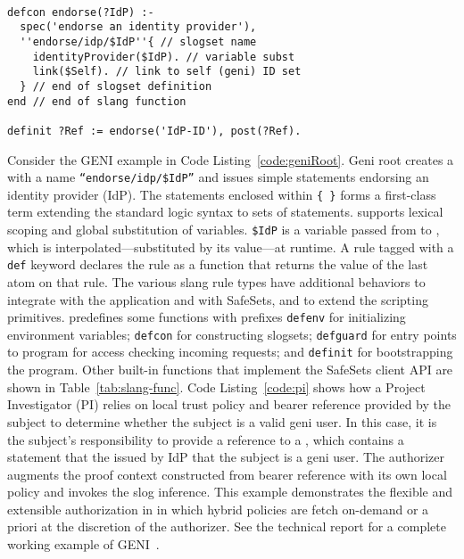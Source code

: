 \begin{lstlisting}[float, showstringspaces=false, caption={Geni root endorses and IdP.}, label=code:geniRoot]

defcon endorse(?IdP) :-
  spec('endorse an identity provider'),
  ''endorse/idp/$IdP''{ // slogset name
    identityProvider($IdP). // variable subst
    link($Self). // link to self (geni) ID set
  } // end of slogset definition
end // end of slang function

definit ?Ref := endorse('IdP-ID'), post(?Ref).

\end{lstlisting}

Consider the GENI example in Code Listing~\ref{code:geniRoot}. Geni root
creates a  with a name {\tt ``endorse/idp/\$IdP''} and issues
simple  statements endorsing an identity provider (IdP). The
statements enclosed within {\tt \{ \}} forms a first-class 
term extending the standard logic syntax to sets of statements. 
supports lexical scoping and global substitution of variables. {\tt \$IdP} is a
variable passed from  to , which is
interpolated---substituted by its value---at runtime.  A  rule
tagged with a {\tt def} keyword declares the rule as a function that returns
the value of the last atom on that rule.  The various slang rule types have
additional behaviors to integrate with the application and with SafeSets, and
to extend the scripting primitives.  predefines some functions
with prefixes {\tt defenv} for initializing environment variables; {\tt defcon} for
constructing slogsets; {\tt defguard} for entry points to 
program for access checking incoming requests; and {\tt definit} for
bootstrapping the  program. Other built-in functions that
implement the SafeSets client API are shown in Table~\ref{tab:slang-func}.
Code Listing~\ref{code:pi} shows how a Project Investigator (PI) relies on
local trust policy and bearer reference provided by the subject to determine
whether the subject is a valid geni user. In this case, it is the subject's
responsibility to provide a reference to a , which contains a
statement that the issued by IdP that the subject is a geni user. The
authorizer augments the proof context constructed from bearer reference with
its own local policy and invokes the slog inference.  This example demonstrates
the flexible and extensible authorization in  in which hybrid
policies are fetch on-demand or a priori at the discretion of the authorizer.
See the technical report for a complete working example of
GENI~\cite{chase14:safegeni}.

